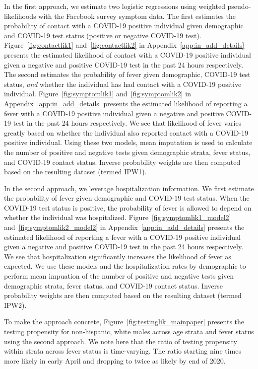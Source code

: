 \documentclass[11pt]{amsart}
\numberwithin{equation}{section}
\theoremstyle{plain}
\begin{document}
In the first approach, we estimate two logistic regressions using weighted pseudo-likelihoods with the Facebook survey symptom data.  The first estimates the probability of contact with a COVID-19 positive individual given demographic and COVID-19 test status (positive or negative COVID-19 test). Figure~\ref{fig:contactlik1} and~\ref{fig:contactlik2} in Appendix~\ref{app:in_add_details} presents the estimated likelihood of contact with a COVID-19 positive individual given a negative and positive COVID-19 test in the past 24 hours respectively.  The second estimates the probability of fever given demographic, COVID-19 test status, \emph{and} whether the individual has had contact with a COVID-19 positive individual.  Figure~\ref{fig:symptomlik1} and~\ref{fig:symptomlik2} in Appendix~\ref{app:in_add_details} presents the estimated likelihood of reporting a fever with a COVID-19 positive individual given a negative and positive COVID-19 test in the past 24 hours respectively.  We see that likelihood of fever varies greatly based on whether the individual also reported contact with a COVID-19 positive individual. Using these two models, mean imputation is used to calculate the number of positive and negative tests given demographic strata, fever status, and COVID-19 contact status. Inverse probability weights are then computed based on the resulting dataset (termed IPW1).


In the second approach, we leverage hospitalization information. We first estimate the probability of fever given demographic and COVID-19 test status.  When the COVID-19 test status is positive, the probability of fever is allowed to depend on whether the individual was hospitalized.  Figure~\ref{fig:symptomlik1_model2} and~\ref{fig:symptomlik2_model2} in Appendix~\ref{app:in_add_details} presents the estimated likelihood of reporting a fever with a COVID-19 positive individual given a negative and positive COVID-19 test in the past 24 hours respectively.  We see that hospitalization significantly increases the likelihood of fever as expected.  We use these models and the hospitalization rates by demographic to perform mean impuation of the number of positive and negative tests given demographic strata, fever status, and COVID-19 contact status. Inverse probability weights are then computed based on the resulting dataset (termed IPW2).

To make the approach concrete, Figure~\ref{fig:testinglik_mainpaper} presents the testing propensity for non-hispanic, white males across age strata and fever status using the second approach.  We note here that the ratio of testing propensity within strata across fever status is time-varying.  The ratio starting nine times more likely in early April and dropping to twice as likely by end of 2020.
\end{document}
